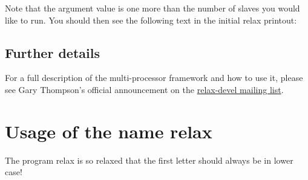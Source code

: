 
Note that the argument  value is one more than the number of slaves you would like to run.  You should then see the following text in the initial relax printout:





\subsection{Further details}

For a full description of the multi-processor framework and how to use it, please see Gary Thompson's official announcement on the \href{https://mail.gna.org/public/relax-devel/2007-05/msg00000.html}{relax-devel mailing list}.




\section{Usage of the name relax}

The program relax is so relaxed that the first letter should always be in lower case!
